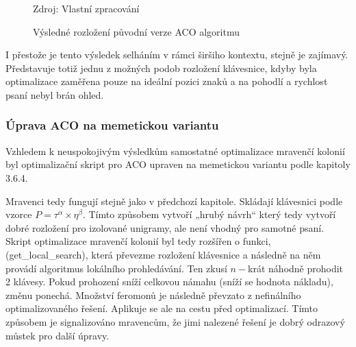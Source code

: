 \documentclass[a4paper, twoside, 12pt, czech]{article}
\begin{document}
\begin{figure}[h]
    \centering
    \caption{Výsledné rozložení původní verze ACO algoritmu}
    \vspace{0.5cm}
    \begin{keyboardlayout}
                     
        \newrow
        
                     
        \newrow
        
                    
        \newrow
        
                   
        \newrow
        
               
    \end{keyboardlayout}
    \small{Zdroj: Vlastní zpracování}
    \label{pic:aco}
\end{figure}

I přestože je tento výsledek selháním v rámci širšiho kontextu, stejně je zajímavý.
Představuje totiž jednu z možných podob rozložení klávesnice, kdyby byla 
optimalizace zaměřena pouze na ideální pozici znaků a na pohodlí a rychlost 
psaní nebyl brán ohled.

\subsubsection{Úprava ACO na memetickou variantu}
Vzhledem k neuspokojivým výsledkům samostatné optimalizace mravenčí kolonií byl
optimalizační skript pro ACO upraven na memetickou variantu podle kapitoly 3.6.4.

Mravenci tedy fungují stejně jako v předchozí kapitole. Skládají klávesnici podle 
vzorce $P = \tau^\alpha \times \eta^\beta$. Tímto způsobem vytvoří „hrubý návrh“
který tedy vytvoří dobré rozložení pro izolované unigramy, ale není vhodný 
pro samotné psaní. Skript optimalizace mravenčí kolonií byl tedy rozšířen o funkci,
(get\_local\_search), která převezme rozložení klávesnice a následně na něm provádí 
algoritmus lokální\-ho prohledávání. Ten zkusí $n-$krát náhodně prohodit 2 klávesy.
Pokud prohození sníží celkovou námahu (sníží se hodnota nákladu), změnu ponechá.
Množství feromonů je následně převzato z nefinálního optimalizovaného řešení. Aplikuje se 
ale na cestu před optimalizací. Tímto způsobem je signalizováno mravencům, že jimi 
nalezené řešení je dobrý odrazový můstek pro další úpravy.
\end{document}
